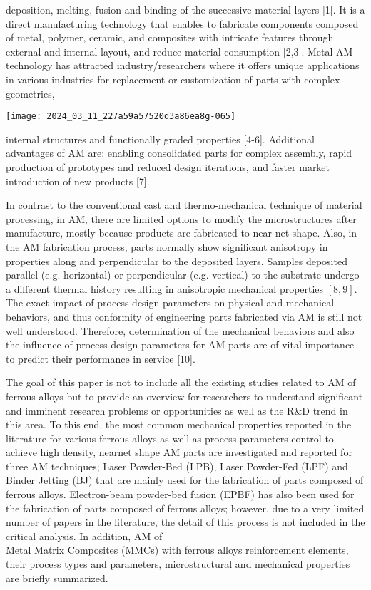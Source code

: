 \documentclass[10pt]{article}
\begin{document}
deposition, melting, fusion and binding of the successive material layers [1]. It is a direct manufacturing technology that enables to fabricate components composed of metal, polymer, ceramic, and composites with intricate features through external and internal layout, and reduce material consumption [2,3]. Metal AM technology has attracted industry/researchers where it offers unique applications in various industries for replacement or customization of parts with complex geometries,

\begin{center}
\texttt{[image: 2024\_03\_11\_227a59a57520d3a86ea8g-065]}
\end{center}

internal structures and functionally graded properties [4-6]. Additional advantages of AM are: enabling consolidated parts for complex assembly, rapid production of prototypes and reduced design iterations, and faster market introduction of new products [7].

In contrast to the conventional cast and thermo-mechanical technique of material processing, in AM, there are limited options to modify the microstructures after manufacture, mostly because products are fabricated to near-net shape. Also, in the AM fabrication process, parts normally show significant anisotropy in properties along and perpendicular to the deposited layers. Samples deposited parallel (e.g. horizontal) or perpendicular (e.g. vertical) to the substrate undergo a different thermal history resulting in anisotropic mechanical properties $[8,9]$. The exact impact of process design parameters on physical and mechanical behaviors, and thus conformity of engineering parts fabricated via AM is still not well understood. Therefore, determination of the mechanical behaviors and also the influence of process design parameters for AM parts are of vital importance to predict their performance in service [10].

The goal of this paper is not to include all the existing studies related to AM of ferrous alloys but to provide an overview for researchers to understand significant and imminent research problems or opportunities as well as the R\&D trend in this area. To this end, the most common mechanical properties reported in the literature for various ferrous alloys as well as process parameters control to achieve high density, nearnet shape AM parts are investigated and reported for three AM techniques; Laser Powder-Bed (LPB), Laser Powder-Fed (LPF) and Binder Jetting (BJ) that are mainly used for the fabrication of parts composed of ferrous alloys. Electron-beam powder-bed fusion (EPBF) has also been used for the fabrication of parts composed of ferrous alloys; however, due to a very limited number of papers in the literature, the detail of this process is not included in the critical analysis. In addition, AM of\\
Metal Matrix Composites (MMCs) with ferrous alloys reinforcement elements, their process types and parameters, microstructural and mechanical properties are briefly summarized.
\end{document}
